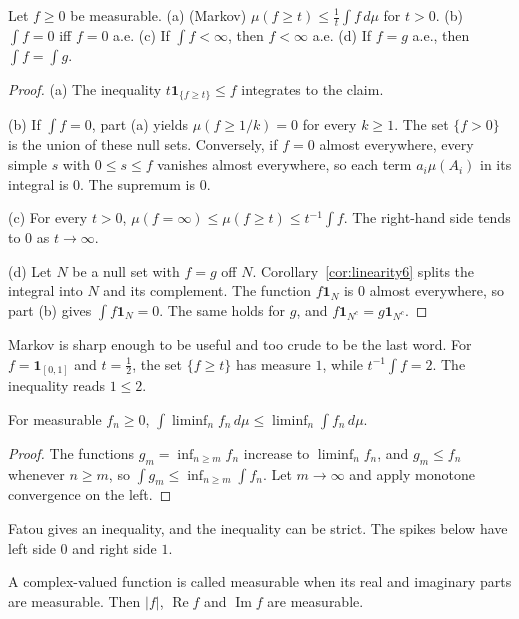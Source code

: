\begin{proposition}\label{prop:markov}
Let \(f\ge0\) be measurable. (a) (Markov) \(\mu(f\ge t)\le\frac1t\int f\,d\mu\) for \(t>0\). (b) \(\int f=0\) iff \(f=0\) a.e. (c) If \(\int f<\infty\), then \(f<\infty\) a.e. (d) If \(f=g\) a.e., then
\(\int f=\int g\).
\end{proposition}
\begin{proof}
(a) The inequality \(t\mathbf 1_{\{f\ge t\}}\le f\) integrates to the claim.

(b) If \(\int f=0\), part (a) yields \(\mu(f\ge1/k)=0\) for every \(k\ge1\). The set \(\{f>0\}\) is the union of these null sets. Conversely, if \(f=0\) almost everywhere, every simple \(s\) with \(0\le s\le f\) vanishes almost everywhere, so each term \(a_i\mu(A_i)\) in its integral is \(0\). The supremum is \(0\).

(c) For every \(t>0\), \(\mu(f=\infty)\le\mu(f\ge t)\le t^{-1}\int f\). The right-hand side tends to \(0\) as \(t\to\infty\).

(d) Let \(N\) be a null set with \(f=g\) off \(N\). Corollary~\ref{cor:linearity6} splits the integral into \(N\) and its complement. The function \(f\mathbf 1_N\) is \(0\) almost everywhere, so part (b) gives \(\int f\mathbf 1_N=0\). The same holds for \(g\), and \(f\mathbf 1_{N^c}=g\mathbf 1_{N^c}\).
\end{proof}

Markov is sharp enough to be useful and too crude to be the last word. For \(f=\mathbf 1_{[0,1]}\) and \(t=\frac12\), the set \(\{f\ge t\}\) has measure \(1\), while \(t^{-1}\int f=2\). The inequality reads \(1\le2\).

\begin{theorem}\label{thm:fatou6}
For measurable \(f_n\ge0\), \(\int\liminf_nf_n\,d\mu\le\liminf_n\int f_n\,d\mu\).
\end{theorem}
\begin{proof}
The functions \(g_m=\inf_{n\ge m}f_n\) increase to \(\liminf_nf_n\), and \(g_m\le f_n\) whenever \(n\ge m\), so \(\int g_m\le\inf_{n\ge m}\int f_n\). Let \(m\to\infty\) and apply monotone convergence on the left.
\end{proof}

Fatou gives an inequality, and the inequality can be strict. The spikes below have left side \(0\) and right side \(1\).

A complex-valued function is called measurable when its real and imaginary parts are measurable. Then \(|f|\), \(\operatorname{Re}f\) and \(\operatorname{Im}f\) are measurable.

